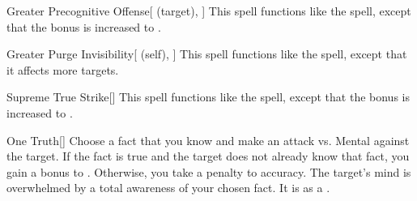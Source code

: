 \lowercase{\hypertarget{spell:Greater Precognitive Offense}{}}\label{spell:Greater Precognitive Offense}
\begin{attuneability}[Rank 6]{\hypertarget{spell:Greater Precognitive Offense}{Greater Precognitive Offense}}[ (target), ]
This spell functions like the  spell, except that the bonus is increased to .
\end{attuneability}
\vspace{0.25em}



\lowercase{\hypertarget{spell:Greater Purge Invisibility}{}}\label{spell:Greater Purge Invisibility}
\begin{attuneability}[Rank 6]{\hypertarget{spell:Greater Purge Invisibility}{Greater Purge Invisibility}}[ (self), ]
This spell functions like the  spell, except that it affects more targets.
\end{attuneability}
\vspace{0.25em}



\lowercase{\hypertarget{spell:Supreme True Strike}{}}\label{spell:Supreme True Strike}
\begin{freeability}[Rank 6]{\hypertarget{spell:Supreme True Strike}{Supreme True Strike}}[]
This spell functions like the  spell, except that the bonus is increased to .
\end{freeability}
\vspace{0.25em}



\lowercase{\hypertarget{spell:One Truth}{}}\label{spell:One Truth}
\begin{freeability}[Rank 8]{\hypertarget{spell:One Truth}{One Truth}}[]
Choose a fact that you know and make an attack vs. Mental against the target.
If the fact is true and the target does not already know that fact, you gain a  bonus to .
Otherwise, you take a  penalty to accuracy.
\hit The target's mind is overwhelmed by a total awareness of your chosen fact.
It is  as a .
\end{freeability}
\vspace{0.25em}




